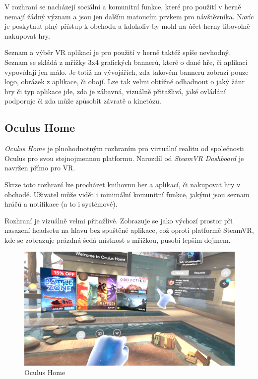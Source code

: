 V rozhraní se nacházejí
sociální a komunitní funkce, které pro použití v herně nemají žádný
význam a jsou jen dalším matoucím prvkem pro návštěvníka. Navíc je poskytnut
plný přístup k obchodu a kdokoliv by mohl na účet herny libovolně
nakupovat hry.

Seznam a výběr VR aplikací je pro použití v herně taktéž spíše nevhodný.
Seznam se skládá z mřížky 3x4 grafických bannerů, které o dané hře, či aplikaci 
vypovídají jen málo. Je totiž na vývojářích, zda takovém banneru
zobrazí pouze logo, obrázek z aplikace, či obojí. Lze tak velmi obtížně
odhadnout o jaký žánr hry či typ aplikace jde, zda je zábavná, vizuálně přitažlivá, jaké
ovládání podporuje či zda může způsobit závratě a kinetózu.

\subsection{Oculus Home}\label{oculus-home}

\emph{Oculus Home} je plnohodnotným rozhraním pro virtuální realitu od
společnosti Oculus pro svou stejnojmennou platformu. Narozdíl od
\emph{SteamVR Dashboard} je navržen přímo pro VR.

Skrze toto rozhraní lze procházet knihovnu her a aplikací, či nakupovat hry v
obchodě. Uživatel může vidět i minimální komunitní funkce, jakými jsou
seznam hráčů a notifikace (a to i systémové).

Rozhraní je vizuálně velmi přitažlivé. Zobrazuje se jako výchozí prostor
při nasazení headsetu na hlavu bez spuštěné aplikace, což oproti platformě
SteamVR, kde se zobrazuje prázdná šedá místnost s mřížkou, působí lepším
dojmem.

\begin{figure}[h!]
\centering
\includegraphics[width=12cm]{src/assets/oculus-home.png}
\caption{Oculus Home}
\end{figure}

